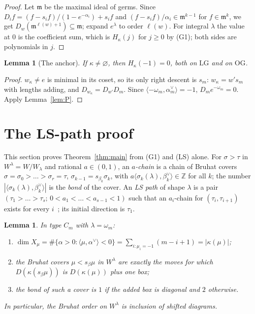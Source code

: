 \documentclass[submission]{FPSAC2027}
\newtheorem{lemma}[theorem]{Lemma}
\theoremstyle{definition}
\theoremstyle{remark}
\newcommand{\LG}{\mathrm{LG}}
\newcommand{\OG}{\mathrm{OG}}
\newcommand{\Z}{\mathbb{Z}}
\begin{document}
\begin{proof}
Let $\mathfrak m$ be the maximal ideal of germs. Since
$D_if=(f-s_if)/(1-e^{-\alpha_i})+s_if$ and $(f-s_if)/\alpha_i\in\mathfrak m^{k-1}$ for
$f\in\mathfrak m^k$, we get $D_w(\mathfrak m^{\ell(w)+1})\subseteq\mathfrak m$; expand $e^\lambda$ to
order $\ell(w)$. For integral $\lambda$ the value at $0$ is the coefficient sum, which is
$H_\kappa(j)$ for $j\ge0$ by (G1); both sides are polynomials in $j$.
\end{proof}

\begin{lemma}[The anchor]\label{lem:anchor}
If $\kappa\ne\varnothing$, then $H_\kappa(-1)=0$, both on $\LG$ and on $\OG$.
\end{lemma}

\begin{proof}
$w_\kappa\ne e$ is minimal in its coset, so its only right descent is $s_m$: $w_\kappa=w's_m$ with
lengths adding, and $D_{w_\kappa}=D_{w'}D_m$. Since $\langle-\omega_m,\alpha_m^\vee\rangle=-1$,
$D_me^{-\omega_m}=0$. Apply Lemma~\ref{lem:P}.
\end{proof}

\section{The LS-path proof}\label{sec:ls}

This section proves Theorem~\ref{thm:main} from (G1) and (LS) alone. For $\sigma>\tau$ in
$W^\lambda=W/W_\lambda$ and rational $a\in(0,1)$, an \emph{$a$-chain} is a chain of Bruhat covers
$\sigma=\sigma_0>\dots>\sigma_r=\tau$, $\sigma_{k-1}=s_{\beta_k}\sigma_k$, with
$a\langle\sigma_k(\lambda),\beta_k^\vee\rangle\in\Z$ for all $k$; the number
$|\langle\sigma_k(\lambda),\beta_k^\vee\rangle|$ is the \emph{bond} of the cover. An \emph{LS path}
of shape $\lambda$ is a pair $(\tau_1>\dots>\tau_s;\,0<a_1<\dots<a_{s-1}<1)$ such that an
$a_i$-chain for $(\tau_i,\tau_{i+1})$ exists for every $i$~\cite{Lit94,LitICM}; its initial
direction is $\tau_1$.

\begin{lemma}\label{lem:bonds}
In type $C_m$ with $\lambda=\omega_m$:
\begin{enumerate}[label=(\alph*)]
\item $\dim X_\mu=\#\{\alpha>0:\langle\mu,\alpha^\vee\rangle<0\}=\sum_{i:\mu_i=-1}(m-i+1)=|\kappa(\mu)|$;
\item the Bruhat covers $\mu<s_\beta\mu$ in $W^\lambda$ are exactly the moves for which
$D(\kappa(s_\beta\mu))$ is $D(\kappa(\mu))$ plus one box;
\item the bond of such a cover is $1$ if the added box is diagonal and $2$ otherwise.
\end{enumerate}
In particular, the Bruhat order on $W^\lambda$ is inclusion of shifted diagrams.
\end{lemma}
\end{document}
